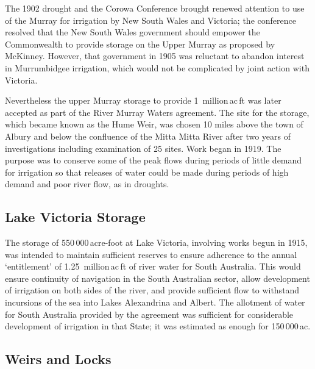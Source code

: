 The 1902 drought and the Corowa Conference brought renewed attention
to use of the Murray for irrigation by New South Wales and Victoria;
the conference resolved that the New South Wales government should
empower the Commonwealth to provide storage on the Upper Murray as
proposed by McKinney.  However, that government in 1905 was reluctant
to abandon interest in Murrumbidgee irrigation, which would not be
complicated by joint action with
Victoria.


Nevertheless the upper Murray storage to provide 1~million\,ac\,ft was
later accepted as part of the River Murray Waters agreement. The site
for the storage, which became known as the Hume Weir, was chosen 10
miles above the town of Albury and below the confluence of the Mitta
Mitta River after two years of investigations including examination of
25 sites.  Work began in 1919.  The purpose was to conserve some of
the peak flows during periods of little demand for irrigation so that
releases of water could be made during periods of high demand and poor
river flow, as in droughts.

\subsection*{Lake Victoria Storage}

The storage of 550\,000\,acre-foot at Lake Victoria, involving works
begun in 1915, was intended to maintain sufficient reserves to ensure
adherence to the annual `entitlement' of 1.25~million\,ac\,ft of river
water for South Australia.  This would ensure continuity of navigation
in the South Australian sector, allow development of irrigation on
both sides of the river, and provide sufficient flow to withstand
incursions of the sea into Lakes Alexandrina and Albert.  The
allotment of water for South Australia provided by the agreement was
sufficient for considerable development of irrigation in that State;
it was estimated as enough for 150\,000\,ac.

\subsection*{Weirs and Locks}

